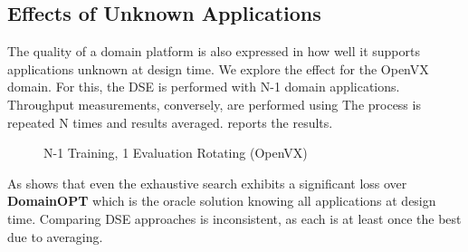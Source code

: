 \subsection{Effects of Unknown Applications}
\label{sec:res:unknown}

The quality of a domain platform is also expressed in how well it supports applications unknown at design time. We explore the effect for the OpenVX domain. For this, the DSE is performed with N-1 domain applications. Throughput measurements, conversely, are performed using  The process is repeated N times and results averaged.  reports the results.

\begin{figure}[h]
	\centering
		\hfill
	\caption{N-1 Training, 1 Evaluation Rotating (OpenVX)}
	\label{fig:unknown}
\end{figure}

As  shows that even the exhaustive search exhibits a significant loss over \textbf{DomainOPT} which is the oracle solution knowing all applications at design time. Comparing DSE approaches is inconsistent, as each is at least once the best due to averaging.  


